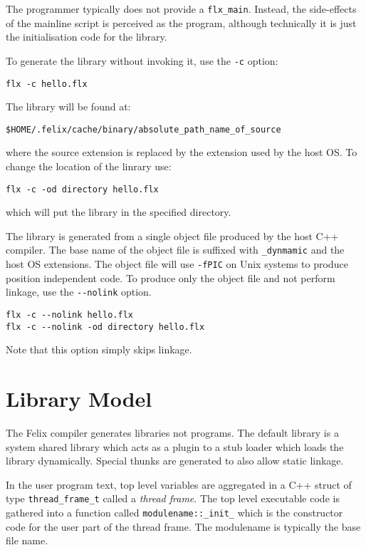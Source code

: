 \documentclass[oneside]{book}
\begin{document}
The programmer typically does not provide a \verb$flx_main$. 
Instead, the side-effects of the mainline script 
is perceived as the program, although technically it is just
the initialisation code for the library.

To generate the library without invoking it, use the \verb$-c$ option:
\begin{verbatim}
flx -c hello.flx
\end{verbatim}

The library will be found at:
\begin{verbatim}
$HOME/.felix/cache/binary/absolute_path_name_of_source
\end{verbatim}
where the source extension is replaced by the extension used
by the host OS. To change the location of the linrary use:

\begin{verbatim}
flx -c -od directory hello.flx
\end{verbatim}
which will put the library in the specified directory.

The library is generated from a single object file produced
by the host C++ compiler. The base name of the object file
is suffixed with \verb$_dynmamic$ and the host OS extensions.
The object file will use \verb$-fPIC$ on Unix systems to produce
position independent code. To produce only the object file
and not perform linkage, use the \verb$--nolink$ option.

\begin{verbatim}
flx -c --nolink hello.flx
flx -c --nolink -od directory hello.flx
\end{verbatim}
Note that this option simply skips linkage.


\chapter{Library Model}
The Felix compiler generates libraries not programs.
The default library is a system shared library which acts as a plugin
to a stub loader which loads the library dynamically. Special thunks
are generated to also allow static linkage.

In the user program text, top level variables are aggregated in a C++ struct
of type \verb$thread_frame_t$ called a {\em thread frame}. The top level executable
code is gathered into a function called \verb$modulename::_init_$ which is the 
constructor code for the user part of the thread frame. The modulename is typically the base
file name.
\end{document}
